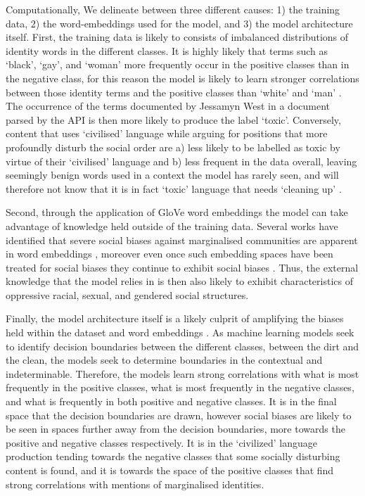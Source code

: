 Computationally, We delineate between three different causes: 1) the training data, 2) the word-embeddings used for the model, and 3) the model architecture itself. First, the training data is likely to consists of imbalanced distributions of identity words in the different classes. It is highly likely that terms such as `black', `gay', and `woman' more frequently occur in the positive classes than in the negative class, for this reason the model is likely to learn stronger correlations between those identity terms and the positive classes than `white' and `man' \citep{Dixon:2018}. The occurrence of the terms documented by Jessamyn West in a document parsed by the API is then more likely to produce the label `toxic'. Conversely, content that uses `civilised' language while arguing for positions that more profoundly disturb the social order are a) less likely to be labelled as toxic by virtue of their `civilised' language and b) less frequent in the data overall, leaving seemingly benign words used in a context the model has rarely seen, and will therefore not know that it is in fact `toxic' language that needs `cleaning up' \cite{Gomes:2018}.

Second, through the application of GloVe word embeddings \cite{Pennington:2014} the model can take advantage of knowledge held outside of the training data. Several works have identified that severe social biases against marginalised communities are apparent in word embeddings \cite{Speer:2017,Bolukbasi:2016,Nissim:2019,Zhao:2017,Zhao:2020}, moreover even once such embedding spaces have been treated for social biases they continue to exhibit social biases \cite{Gonen:2019}. Thus, the external knowledge that the model relies in is then also likely to exhibit characteristics of oppressive racial, sexual, and gendered social structures.

Finally, the model architecture itself is a likely culprit of amplifying the biases held within the dataset and word embeddings \cite{Zhao:2017}. As machine learning models seek to identify decision boundaries between the different classes, between the dirt and the clean, the models seek to determine boundaries in the contextual and indeterminable. Therefore, the models learn strong correlations with what is most frequently in the positive classes, what is most frequently in the negative classes, and what is frequently in both positive and negative classes. It is in the final space that the decision boundaries are drawn, however social biases are likely to be seen in spaces further away from the decision boundaries, more towards the positive and negative classes respectively. It is in the `civilized' language production tending towards the negative classes that some socially disturbing content is found, and it is towards the space of the positive classes that find strong correlations with mentions of marginalised identities.\vspace{5mm}

